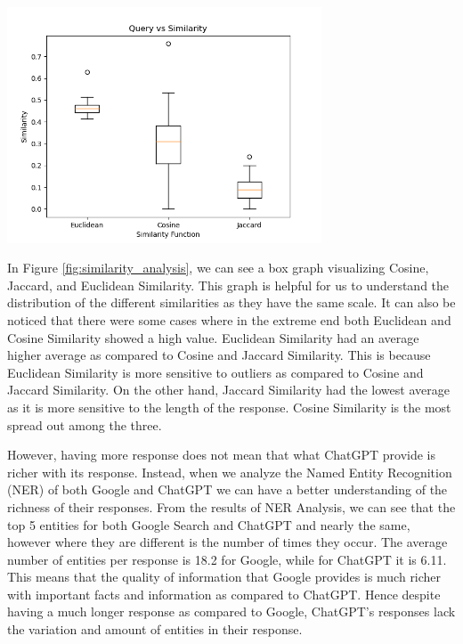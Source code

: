 \documentclass[50pt]{usiinfbachelorproject}
\begin{document}
\noindent
\begin{minipage}{\linewidth}
\centering
\includegraphics[width=0.7\textwidth]{images/similarity-analysis-box.png}
\label{fig:similarity_analysis}
\end{minipage}

In Figure \ref{fig:similarity_analysis}, we can see a box graph visualizing Cosine, Jaccard, and Euclidean Similarity. This graph is helpful for us to understand the distribution of the different similarities as they have the same scale. It can also be noticed that there were some cases where in the extreme end both Euclidean and Cosine Similarity showed a high value. Euclidean Similarity had an average higher average as compared to Cosine and Jaccard Similarity. This is because Euclidean Similarity is more sensitive to outliers as compared to Cosine and Jaccard Similarity. On the other hand, Jaccard Similarity had the lowest average as it is more sensitive to the length of the response. Cosine Similarity is the most spread out among the three.

However, having more response does not mean that what ChatGPT provide is richer with its response. Instead, when we analyze the Named Entity Recognition (NER) of both Google and ChatGPT we can have a better understanding of the richness of their responses. From the results of NER Analysis, we can see that the top 5 entities for both Google Search and ChatGPT and nearly the same, however where they are different is the number of times they occur. The average number of entities per response is 18.2 for Google, while for ChatGPT it is 6.11. This means that the quality of information that Google provides is much richer with important facts and information as compared to ChatGPT. Hence despite having a much longer response as compared to Google, ChatGPT’s responses lack the variation and amount of entities in their response. 
\end{document}
